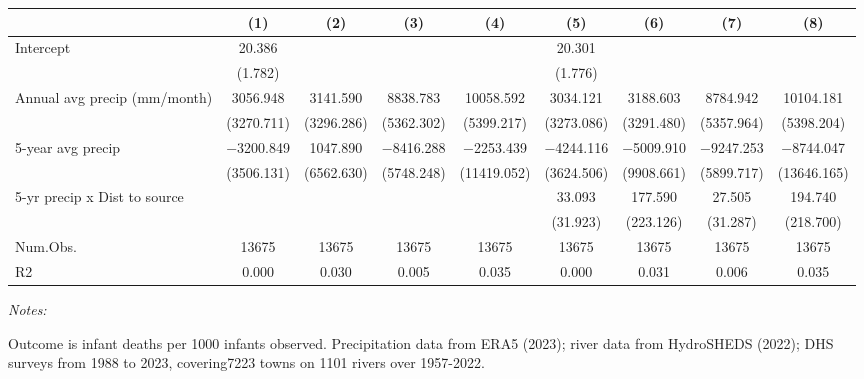 \begin{table}[H]
\centering
\begin{threeparttable}
\begin{tabular}[t]{lcccccccc}
\toprule
  & (1) & (2) & (3) & (4) & (5) & (6) & (7) & (8)\\
\midrule
Intercept & \num{20.386} &  &  &  & \num{20.301} &  &  & \\
 & (\num{1.782}) &  &  &  & (\num{1.776}) &  &  & \\
Annual avg precip (mm/month) & \num{3056.948} & \num{3141.590} & \num{8838.783} & \num{10058.592} & \num{3034.121} & \num{3188.603} & \num{8784.942} & \num{10104.181}\\
 & (\num{3270.711}) & (\num{3296.286}) & (\num{5362.302}) & (\num{5399.217}) & (\num{3273.086}) & (\num{3291.480}) & (\num{5357.964}) & (\num{5398.204})\\
5-year avg precip & \num{-3200.849} & \num{1047.890} & \num{-8416.288} & \num{-2253.439} & \num{-4244.116} & \num{-5009.910} & \num{-9247.253} & \num{-8744.047}\\
 & (\num{3506.131}) & (\num{6562.630}) & (\num{5748.248}) & (\num{11419.052}) & (\num{3624.506}) & (\num{9908.661}) & (\num{5899.717}) & (\num{13646.165})\\
5-yr precip x Dist to source &  &  &  &  & \num{33.093} & \num{177.590} & \num{27.505} & \num{194.740}\\
 &  &  &  &  & (\num{31.923}) & (\num{223.126}) & (\num{31.287}) & (\num{218.700})\\
\midrule
Num.Obs. & \num{13675} & \num{13675} & \num{13675} & \num{13675} & \num{13675} & \num{13675} & \num{13675} & \num{13675}\\
R2 & \num{0.000} & \num{0.030} & \num{0.005} & \num{0.035} & \num{0.000} & \num{0.031} & \num{0.006} & \num{0.035}\\
\bottomrule
\end{tabular}
\begin{tablenotes}
\item \textit{Notes: } 
\item Outcome is infant deaths per 1000 infants observed. Precipitation data from ERA5 (2023); river data from HydroSHEDS (2022); DHS surveys from 1988 to 2023, covering7223 towns on 1101 rivers over 1957-2022. 
\end{tablenotes}
\end{threeparttable}
\end{table}
